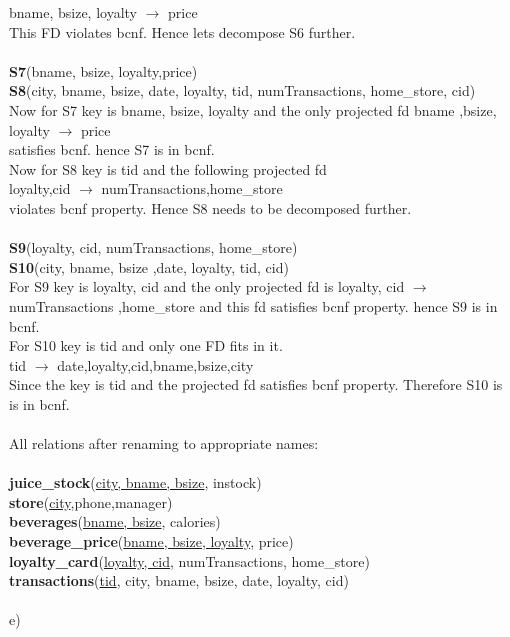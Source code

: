 \documentclass{article}
\begin{document}
\begin{enumerate}
		bname, bsize, loyalty $\rightarrow$ price\\
	  This FD violates bcnf. Hence lets decompose S6 further.\\\\
	  \textbf{S7}(bname, bsize, loyalty,price)\\
	  \textbf{S8}(city, bname, bsize, date, loyalty, tid, numTransactions, home\_store, cid)\\
	  Now for S7 key is bname, bsize, loyalty and the only projected fd bname ,bsize, loyalty $\rightarrow$ price\\ satisfies bcnf.
	  hence S7 is in bcnf.\\
	  Now for S8 key is tid and the following projected fd \\		loyalty,cid $\rightarrow$ numTransactions,home\_store\\
	 violates bcnf property. Hence S8 needs to be decomposed further.\\\\
	   \textbf{S9}(loyalty, cid, numTransactions, home\_store)\\
	   \textbf{S10}(city, bname, bsize ,date, loyalty, tid, cid)\\
	  For S9 key is loyalty, cid and the only projected fd is loyalty, cid $\rightarrow$ numTransactions ,home\_store and this fd satisfies bcnf property.
	  hence S9 is in bcnf.\\
	  For S10 key is tid and only one FD fits in it.\\
		tid $\rightarrow$ date,loyalty,cid,bname,bsize,city\\
	  Since the key is tid and the projected fd satisfies bcnf property. Therefore S10 is is in bcnf.\\\\
	  All relations after renaming to appropriate names:\\\\
		 \textbf{juice\_stock}(\underline{city, bname, bsize}, instock)\\
		 \textbf{store}(\underline{city},phone,manager)\\
		 \textbf{beverages}(\underline{bname, bsize}, calories)\\
		 \textbf{beverage\_price}(\underline{bname, bsize, loyalty}, price)\\
		 \textbf{loyalty\_card}(\underline{loyalty, cid}, numTransactions, home\_store)\\
		 \textbf{transactions}(\underline{tid}, city, bname, bsize, date, loyalty, cid)\\\\
	e)
		
	
       

\end{enumerate}
\end{document}
